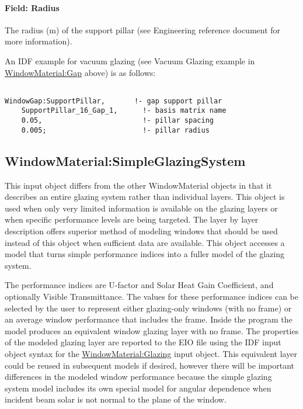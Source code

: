 \paragraph{Field: Radius}\label{field-radius}

The radius (m) of the support pillar (see Engineering reference document for more information).

An IDF example for vacuum glazing (see Vacuum Glazing example in \hyperref[windowmaterialgap]{WindowMaterial:Gap} above) is as follows:

\begin{lstlisting}

WindowGap:SupportPillar,       !- gap support pillar
    SupportPillar_16_Gap_1,      !- basis matrix name
    0.05,                        !- pillar spacing
    0.005;                       !- pillar radius
\end{lstlisting}

\subsection{WindowMaterial:SimpleGlazingSystem}\label{windowmaterialsimpleglazingsystem}


This input object differs from the other WindowMaterial objects in that it describes an entire glazing system rather than individual layers. This object is used when only very limited information is available on the glazing layers or when specific performance levels are being targeted. The layer by layer description offers superior method of modeling windows that should be used instead of this object when sufficient data are available. This object accesses a model that turns simple performance indices into a fuller model of the glazing system.

The performance indices are U-factor and Solar Heat Gain Coefficient, and optionally Visible Transmittance. The values for these performance indices can be selected by the user to represent either glazing-only windows (with no frame) or an average window performance that includes the frame. Inside the program the model produces an equivalent window glazing layer with no frame. The properties of the modeled glazing layer are reported to the EIO file using the IDF input object syntax for the \hyperref[windowmaterialglazing]{WindowMaterial:Glazing} input object. This equivalent layer could be reused in subsequent models if desired, however there will be important differences in the modeled window performance because the simple glazing system model includes its own special model for angular dependence when incident beam solar is not normal to the plane of the window.

